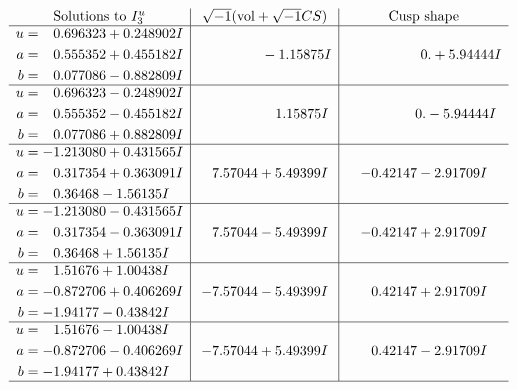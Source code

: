 \documentclass[1p]{elsarticle_modified}
\theoremstyle{definition}
\newcommand{\I}{\sqrt{-1}}
\begin{document}
$$\begin{array}{c|c|c}  
\text{Solutions to }I^u_{3}& \I (\text{vol} + \sqrt{-1}CS) & \text{Cusp shape}\\
 \hline 
\begin{aligned}
u &= \phantom{-}0.696323 + 0.248902 I \\
a &= \phantom{-}0.555352 + 0.455182 I \\
b &= \phantom{-}0.077086 - 0.882809 I\end{aligned}
 & \phantom{-0.000000 } -1.15875 I & \phantom{-0.000000 -}0. + 5.94444 I \\ \hline\begin{aligned}
u &= \phantom{-}0.696323 - 0.248902 I \\
a &= \phantom{-}0.555352 - 0.455182 I \\
b &= \phantom{-}0.077086 + 0.882809 I\end{aligned}
 & \phantom{-0.000000 -}1.15875 I & \phantom{-0.000000 } 0. - 5.94444 I \\ \hline\begin{aligned}
u &= -1.213080 + 0.431565 I \\
a &= \phantom{-}0.317354 + 0.363091 I \\
b &= \phantom{-}0.36468 - 1.56135 I\end{aligned}
 & \phantom{-}7.57044 + 5.49399 I & -0.42147 - 2.91709 I \\ \hline\begin{aligned}
u &= -1.213080 - 0.431565 I \\
a &= \phantom{-}0.317354 - 0.363091 I \\
b &= \phantom{-}0.36468 + 1.56135 I\end{aligned}
 & \phantom{-}7.57044 - 5.49399 I & -0.42147 + 2.91709 I \\ \hline\begin{aligned}
u &= \phantom{-}1.51676 + 1.00438 I \\
a &= -0.872706 + 0.406269 I \\
b &= -1.94177 - 0.43842 I\end{aligned}
 & -7.57044 - 5.49399 I & \phantom{-}0.42147 + 2.91709 I \\ \hline\begin{aligned}
u &= \phantom{-}1.51676 - 1.00438 I \\
a &= -0.872706 - 0.406269 I \\
b &= -1.94177 + 0.43842 I\end{aligned}
 & -7.57044 + 5.49399 I & \phantom{-}0.42147 - 2.91709 I\\
 \hline 
 \end{array}$$\newpage\newpage\renewcommand{\arraystretch}{1}
\end{document}
